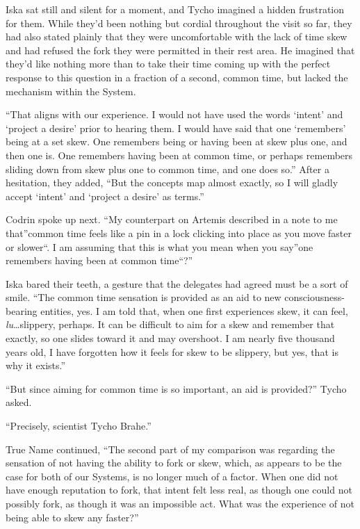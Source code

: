 Iska sat still and silent for a moment, and Tycho imagined a hidden frustration for them. While they'd been nothing but cordial throughout the visit so far, they had also stated plainly that they were uncomfortable with the lack of time skew and had refused the fork they were permitted in their rest area. He imagined that they'd like nothing more than to take their time coming up with the perfect response to this question in a fraction of a second, common time, but lacked the mechanism within the System.

``That aligns with our experience. I would not have used the words `intent' and `project a desire' prior to hearing them. I would have said that one `remembers' being at a set skew. One remembers being or having been at skew plus one, and then one is. One remembers having been at common time, or perhaps remembers sliding down from skew plus one to common time, and one does so.'' After a hesitation, they added, ``But the concepts map almost exactly, so I will gladly accept `intent' and `project a desire' as terms.''

Codrin spoke up next. ``My counterpart on Artemis described in a note to me that''common time feels like a pin in a lock clicking into place as you move faster or slower``. I am assuming that this is what you mean when you say''one remembers having been at common time``?''

Iska bared their teeth, a gesture that the delegates had agreed must be a sort of smile. ``The common time sensation is provided as an aid to new consciousness-bearing entities, yes. I am told that, when one first experiences skew, it can feel, \emph{lu}\ldots slippery, perhaps. It can be difficult to aim for a skew and remember that exactly, so one slides toward it and may overshoot. I am nearly five thousand years old, I have forgotten how it feels for skew to be slippery, but yes, that is why it exists.''

``But since aiming for common time is so important, an aid is provided?'' Tycho asked.

``Precisely, scientist Tycho Brahe.''

True Name continued, ``The second part of my comparison was regarding the sensation of not having the ability to fork or skew, which, as appears to be the case for both of our Systems, is no longer much of a factor. When one did not have enough reputation to fork, that intent felt less real, as though one could not possibly fork, as though it was an impossible act. What was the experience of not being able to skew any faster?''

